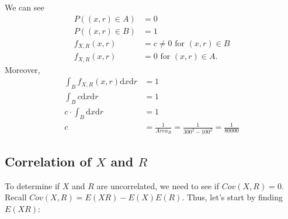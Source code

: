 \documentclass[paper=a4, fontsize=11pt]{scrartcl} %
\numberwithin{equation}{section} %
\numberwithin{figure}{section} %
\numberwithin{table}{section} %
\begin{document}
\begin{center}
\end{center}
We can see
\begin{align*}
P((x,r) \in A) &= 0\\
P((x,r) \in B) &= 1\\
f_{X,R}(x,r) &= c \neq 0 \textrm{ for } (x,r) \in B\\
f_{X,R}(x,r) &= 0 \textrm{ for } (x,r) \in A.
\end{align*}
Moreover,
\begin{align*}
\int_{B} f_{X,R}(x,r) \textrm{d} x \textrm{d} r &= 1\\
\int_{B} c \textrm{d} x \textrm{d} r &= 1\\
c \cdot \int_{B} \textrm{d} x \textrm{d} r &= 1\\
c &= \frac{1}{Area_B} = \frac{1}{300^2-100^2} = \frac{1}{80000}
\end{align*}

\subsection{Correlation of $X$ and $R$}

To determine if $X$ and $R$ are uncorrelated, we need to see if $Cov(X,R) = 0$. Recall $Cov(X,R) = E(XR) - E(X)E(R)$. Thus, let's start by finding $E(XR)$:
\end{document}
